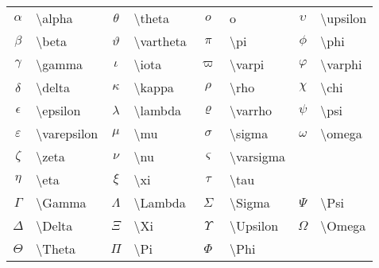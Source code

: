 \documentclass[a4paper]{ctexart}
\begin{document}
    \begin{tabular}{clclclcl}
        \toprule
        $\alpha$        & \textbackslash alpha      & $\theta$      & \textbackslash theta      &
        $o$             & o                         & $\upsilon$    & \textbackslash upsilon    \\
        $\beta$         & \textbackslash beta       & $\vartheta$   & \textbackslash vartheta   &
        $\pi$           & \textbackslash pi         & $\phi$        & \textbackslash phi        \\
        $\gamma$        & \textbackslash gamma      & $\iota$       & \textbackslash iota       &
        $\varpi$        & \textbackslash varpi      & $\varphi$     & \textbackslash varphi     \\
        $\delta$        & \textbackslash delta      & $\kappa$      & \textbackslash kappa      &
        $\rho$          & \textbackslash rho        & $\chi$        & \textbackslash chi        \\
        $\epsilon$      & \textbackslash epsilon    & $\lambda$     & \textbackslash lambda     &
        $\varrho$       & \textbackslash varrho     & $\psi$        & \textbackslash psi        \\
        $\varepsilon$   & \textbackslash varepsilon & $\mu$         & \textbackslash mu         & 
        $\sigma$        & \textbackslash sigma      & $\omega$      & \textbackslash omega      \\
        $\zeta$         & \textbackslash zeta       & $\nu$         & \textbackslash nu         &
        $\varsigma$     & \textbackslash varsigma                                               \\ 
        $\eta$          & \textbackslash eta        & $\xi$         & \textbackslash xi         & 
        $\tau$          & \textbackslash tau                                                    \\
        \midrule
        $\Gamma$        & \textbackslash Gamma      & $\Lambda$     & \textbackslash Lambda     &
        $\Sigma$        & \textbackslash Sigma      & $\Psi$        & \textbackslash Psi        \\
        $\Delta$        & \textbackslash Delta      & $\Xi$         & \textbackslash Xi         &
        $\Upsilon$      & \textbackslash Upsilon    & $\Omega$      & \textbackslash Omega      \\
        $\Theta$        & \textbackslash Theta      & $\Pi$         & \textbackslash Pi         & 
        $\Phi$          & \textbackslash Phi                                                    \\

\end{tabular}
\end{document}
